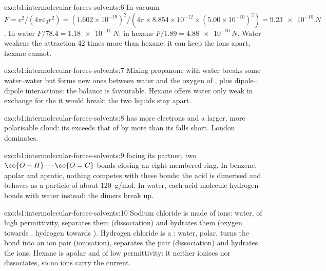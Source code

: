 \begin{solution}{exo:b1:intermolecular-forces-solvents:6}
In vacuum $F = e^2/(4\pi\varepsilon_0 r^2) = (1.602 \times
10^{-19})^2/(4\pi \times 8.854 \times 10^{-12} \times (5.00 \times
10^{-10})^2) = \qty{9.23e-10}{N}$. In water $F/78.4 = \qty{1.18e-11}{N}$;
in hexane $F/1.89 = \qty{4.88e-10}{N}$. Water weakens the attraction 42
times more than hexane: it can keep the ions apart, hexane cannot.
\end{solution}

\begin{solution}{exo:b1:intermolecular-forces-solvents:7}
Mixing propanone with water breaks some water--water  but
forms new ones between water and the oxygen of , plus
dipole--dipole interactions: the balance is favourable. Hexane offers
water only weak  in exchange for the  it
would break: the two liquids stay apart.
\end{solution}

\begin{solution}{exo:b1:intermolecular-forces-solvents:8}
 has more electrons and a larger, more polarisable cloud: its
 exceeds that of  by more than its  falls short. London dominates.
\end{solution}

\begin{solution}{exo:b1:intermolecular-forces-solvents:9}
 facing its partner, two
$\ce{O-H}\cdots\ce{O=C}$ bonds closing an eight-membered ring. In benzene,
apolar and aprotic, nothing competes with these bonds: the acid is
dimerised and behaves as a particle of about \qty{120}{g/mol}. In water,
each acid molecule hydrogen-bonds with water instead: the dimers break up.
\end{solution}

\begin{solution}{exo:b1:intermolecular-forces-solvents:10}
Sodium chloride is made of ions: water, of high permittivity, separates
them (dissociation) and hydrates them (oxygen towards , hydrogen
towards ). Hydrogen chloride is a : water, polar,
turns the  bond into an ion pair  (ionisation),
separates the pair (dissociation) and hydrates the ions. Hexane is apolar
and of low permittivity: it neither ionises nor dissociates, so no ions
carry the current.
\end{solution}

